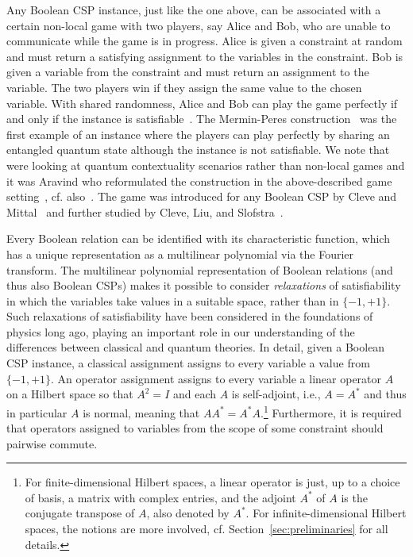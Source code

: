 \documentclass[11pt,letter]{article}
\begin{document}
Any Boolean CSP instance, just like the one above, can be associated with a certain non-local game with two
players, say Alice and Bob, who are unable to communicate while the game is in
progress. Alice is given a constraint at
random and must return a satisfying assignment to the variables in the
constraint. Bob is given a variable from the constraint and must return an
assignment to the variable. The two players win if they assign the same value to
the chosen variable. With shared randomness, Alice and Bob can play the game
perfectly if and only if the instance is satisfiable~\cite{Cleve14:icalp}.
The Mermin-Peres
construction~\cite{Mermin1990simple,Peres1990incompatible}
was the first example of an instance where the players can play perfectly by
sharing an entangled quantum state although the instance is not satisfiable. We
note that~\cite{Mermin1990simple,Peres1990incompatible} were looking at quantum contextuality scenarios rather than
non-local games and it was Aravind who reformulated the construction in the above-described
game setting~\cite{aravind2002bell}, cf. also~\cite{Cleve04:ccc}. The game was introduced for any Boolean
CSP by Cleve and Mittal~\cite{Cleve14:icalp}
and further studied by Cleve, Liu, and Slofstra~\cite{Cleve17:jmp-perfect}.

Every Boolean relation can be identified with its characteristic function, which
has a unique representation as a multilinear polynomial via the Fourier
transform. The multilinear polynomial representation of Boolean relations (and
thus also Boolean CSPs) makes it possible to consider \emph{relaxations} of
satisfiability in which the variables take values in a suitable space,
rather than in $\{-1,+1\}$. Such relaxations of satisfiability have been
considered in the  foundations of physics long ago, playing an important role in
our understanding of the differences between classical and quantum theories.
In detail, given a Boolean CSP instance, a classical assignment assigns to every
variable a value from $\{-1,+1\}$. An operator assignment assigns to every
variable a linear operator $A$ on a Hilbert space so that $A^2=I$
and each $A$ is self-adjoint, i.e., $A=A^*$ and thus in particular $A$ is
normal, meaning that $AA^*=A^*A$.\footnote{For finite-dimensional Hilbert
spaces, a linear operator is just, up to a choice of basis, a matrix with
complex entries, and the adjoint $A^*$ of $A$ is the conjugate transpose of $A$,
also denoted by $A^*$. For
infinite-dimensional Hilbert spaces, the notions are more involved, cf.
Section~\ref{sec:preliminaries} for all details.}
Furthermore, it is required that operators
assigned to variables from the scope of some constraint should pairwise commute. 
\end{document}
